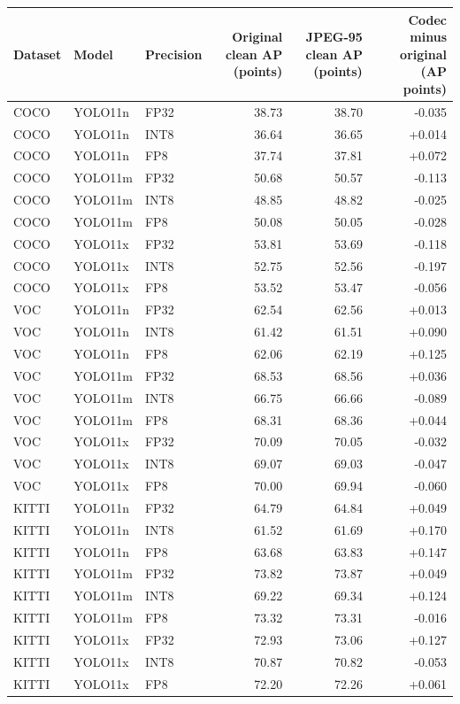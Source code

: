 \begin{tabular}{lllrrr}
\toprule
Dataset & Model & Precision & Original clean AP (points) & JPEG-95 clean AP (points) & Codec minus original (AP points) \\
\midrule
COCO & YOLO11n & FP32 & 38.73 & 38.70 & -0.035 \\
COCO & YOLO11n & INT8 & 36.64 & 36.65 & +0.014 \\
COCO & YOLO11n & FP8 & 37.74 & 37.81 & +0.072 \\
COCO & YOLO11m & FP32 & 50.68 & 50.57 & -0.113 \\
COCO & YOLO11m & INT8 & 48.85 & 48.82 & -0.025 \\
COCO & YOLO11m & FP8 & 50.08 & 50.05 & -0.028 \\
COCO & YOLO11x & FP32 & 53.81 & 53.69 & -0.118 \\
COCO & YOLO11x & INT8 & 52.75 & 52.56 & -0.197 \\
COCO & YOLO11x & FP8 & 53.52 & 53.47 & -0.056 \\
VOC & YOLO11n & FP32 & 62.54 & 62.56 & +0.013 \\
VOC & YOLO11n & INT8 & 61.42 & 61.51 & +0.090 \\
VOC & YOLO11n & FP8 & 62.06 & 62.19 & +0.125 \\
VOC & YOLO11m & FP32 & 68.53 & 68.56 & +0.036 \\
VOC & YOLO11m & INT8 & 66.75 & 66.66 & -0.089 \\
VOC & YOLO11m & FP8 & 68.31 & 68.36 & +0.044 \\
VOC & YOLO11x & FP32 & 70.09 & 70.05 & -0.032 \\
VOC & YOLO11x & INT8 & 69.07 & 69.03 & -0.047 \\
VOC & YOLO11x & FP8 & 70.00 & 69.94 & -0.060 \\
KITTI & YOLO11n & FP32 & 64.79 & 64.84 & +0.049 \\
KITTI & YOLO11n & INT8 & 61.52 & 61.69 & +0.170 \\
KITTI & YOLO11n & FP8 & 63.68 & 63.83 & +0.147 \\
KITTI & YOLO11m & FP32 & 73.82 & 73.87 & +0.049 \\
KITTI & YOLO11m & INT8 & 69.22 & 69.34 & +0.124 \\
KITTI & YOLO11m & FP8 & 73.32 & 73.31 & -0.016 \\
KITTI & YOLO11x & FP32 & 72.93 & 73.06 & +0.127 \\
KITTI & YOLO11x & INT8 & 70.87 & 70.82 & -0.053 \\
KITTI & YOLO11x & FP8 & 72.20 & 72.26 & +0.061 \\

\end{tabular}
